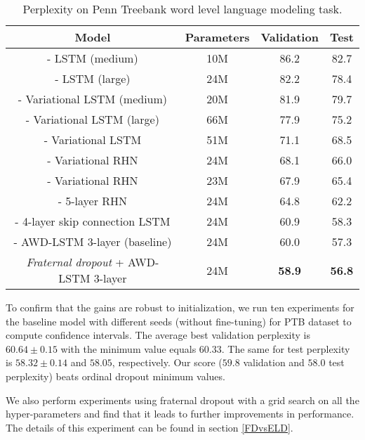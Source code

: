 \documentclass{article} %
\begin{document}
\begin{table}[t]
\vspace{-0.08cm}
\centering
\begin{tabular}{c | c c c} 
\textbf{Model} & \textbf{Parameters}  & \textbf{Validation} & \textbf{Test}\\
\hline
\cite{zaremba2014recurrent} - LSTM (medium) & 10M & 86.2 & 82.7\\
\cite{zaremba2014recurrent} - LSTM (large) & 24M & 82.2 & 78.4\\
\cite{vdropout} - Variational LSTM (medium) & 20M & 81.9 & 79.7\\
\cite{vdropout} - Variational LSTM (large) & 66M & 77.9 & 75.2\\
\cite{inan2016tying} - Variational LSTM & 51M & 71.1 & 68.5\\
\cite{inan2016tying} - Variational RHN & 24M & 68.1 & 66.0\\
\cite{zilly2016recurrent} - Variational RHN & 23M & 67.9 & 65.4\\
\cite{melis2017state} - 5-layer RHN & 24M & 64.8 & 62.2\\
\cite{melis2017state} - 4-layer skip connection LSTM & 24M & 60.9 & 58.3\\
\hline
\cite{merity2017regularizing} - AWD-LSTM 3-layer (baseline) & 24M & 60.0 & 57.3 \\
\hline
\emph{Fraternal dropout} + AWD-LSTM 3-layer & 24M & \textbf{58.9} & \textbf{56.8}\\
\end{tabular}
\caption{Perplexity on Penn Treebank word level language modeling task.}
\label{table:PTB24M}
\vspace{-0.08cm}
\end{table}

To confirm that the gains are robust to initialization, we run ten experiments for the baseline model with different seeds (without fine-tuning) for PTB dataset to compute confidence intervals. The average best validation perplexity is $60.64 \pm 0.15$ with the minimum value equals $60.33$. The same for test perplexity is $58.32 \pm 0.14$ and $58.05$, respectively. Our score ($59.8$ validation and $58.0$ test perplexity) beats ordinal dropout minimum values.

We also perform experiments using fraternal dropout with a grid search on all the hyper-parameters and find that it leads to further improvements in performance. The details of this experiment can be found in section \ref{FDvsELD}. %
\end{document}
